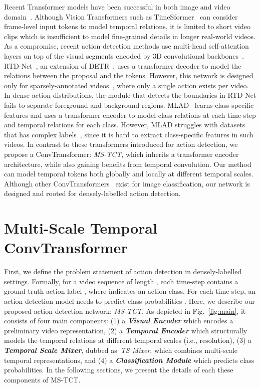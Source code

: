 \documentclass[10pt,twocolumn,letterpaper]{article}
\begin{document}
Recent Transformer models have been successful in both image and video domain~\cite{zhu2020deformable,dosovitskiy2020image,liu2021swin,zhou2021deepvit,wang2021pyramid,wang2021pvtv2,xie2021segformer,cheng2021per,arnab2021vivit,liu2021video,timesformer, ryoo2021tokenlearner}.
Although Vision Transformers such as TimeSformer~\cite{transformer} can consider frame-level input tokens to model temporal relations, it is limited to short video clips which is insufficient to model fine-grained details in longer real-world videos. 
As a compromise, recent action detection methods use multi-head self-attention layers on top of the visual segments encoded by 3D convolutional backbones~\cite{i3d}. RTD-Net~\cite{tan2021relaxed}, an extension of DETR~\cite{zhu2020deformable}, uses a transformer decoder to model the relations between the proposal and the tokens. However, this network is designed only for sparsely-annotated videos~\cite{THUMOS14,caba2015activitynet}, where only a single action exists per video. In dense action distributions, the module that detects the boundaries in RTD-Net fails to separate foreground and background regions. MLAD~\cite{MLAD} learns class-specific features and uses a transformer encoder to model class relations at each time-step and temporal relations for each class. However, MLAD struggles with datasets that has complex labels~\cite{charades}, since it is hard to extract class-specific features in such videos.
In contrast to these transformers introduced for action detection, we propose a ConvTransformer: \textit{MS-TCT}, which inherits a transformer encoder architecture, while also gaining benefits from temporal convolution. Our method can model temporal tokens both globally and locally at different temporal scales. 
Although other ConvTransformers~\cite{wu2021cvt,d2021convit,guo2021cmt, kahatapitiya2021swat} exist for image classification,
our network is designed and rooted for densely-labelled action detection.



\section{Multi-Scale Temporal ConvTransformer}
\label{sec:method}

First, we define the problem statement of action detection in densely-labelled settings. Formally, for a video sequence of length , each time-step  contains a ground-truth action label , where  indicates an action class. For each time-step, an action detection model needs to predict class probabilities .
Here, we describe our proposed action detection network: \textit{MS-TCT}. 
As depicted in Fig.~\ref{fig:main}, it consists of four main components:
(1) a \textit{\textbf{Visual Encoder}} which encodes a preliminary video representation, (2) a \textit{\textbf{Temporal Encoder}} which structurally models the temporal relations at different temporal scales (i.e., resolution), (3) a \textit{\textbf{ Temporal Scale Mixer}}, dubbed as~\textit{TS Mixer}, which combines multi-scale temporal representations, and (4) a \textit{\textbf{Classification Module}} which predicts class probabilities. 
In the following sections, we present the details of each these components of MS-TCT. 
\end{document}
